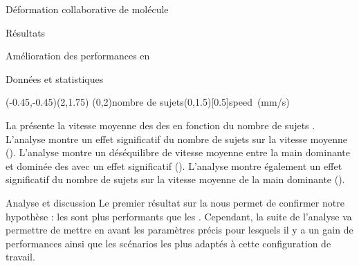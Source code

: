 \documentclass[myfrancais]{mythesis}
\begin{document}
\begin{mychapter}{Déformation collaborative de molécule}
\begin{mysection}{Résultats}
\begin{mysubsection}{Amélioration des performances en }
\begin{mysubsubsection}{Données et statistiques}
					\begin{myfigure}
						\begin{myps}(-0.45,-0.45)(2,1.75)
							\myaxes(0,2){nombre de sujets}(0,1.5)[0.5]{speed~(mm/s)}
						\end{myps}
					\end{myfigure}

					La  présente la vitesse moyenne des   des  en fonction du nombre de sujets .
					L'analyse montre un effet significatif du nombre de sujets  sur la vitesse moyenne  ().
					L'analyse montre un déséquilibre de vitesse moyenne entre la main dominante et dominée des  avec un effet significatif ().
					L'analyse montre également un effet significatif du nombre de sujets  sur la vitesse moyenne  de la main dominante ().
				\end{mysubsubsection}
				\begin{mysubsubsection}{Analyse et discussion}
					Le premier résultat sur la  nous permet de confirmer notre hypothèse  : les  sont plus performants que les .
					Cependant, la suite de l'analyse va permettre de mettre en avant les paramètres précis pour lesquels il y a un gain de performances ainsi que les scénarios les plus adaptés à cette configuration de travail.


\end{mysubsubsection}
\end{mysubsection}
\end{mysection}
\end{mychapter}
\end{document}
